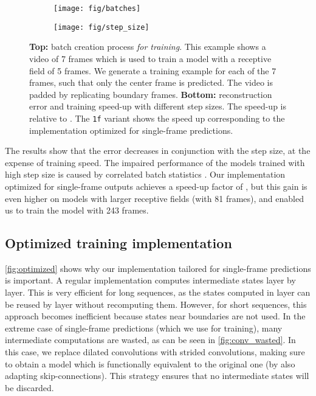 \documentclass[10pt,twocolumn,letterpaper]{article}
\begin{document}
\begin{figure}
	\centering
\begin{subfigure}{0.5\linewidth}
	    \centering
	    \texttt{[image: fig/batches]}
    	\caption{}
        \label{fig:batching}
	\end{subfigure}
\begin{subfigure}{\linewidth}
	    \centering
	    \texttt{[image: fig/step\_size]}
		\caption{}
		\label{fig:step_size}
	\end{subfigure}
	\caption{\textbf{Top:} batch creation process \emph{for training}. 
	This example shows a video of 7 frames which is used to train a model with a receptive field of 5 frames. 
	We generate a training example for each of the 7 frames, such that only the center frame is predicted. 
	The video is padded by replicating boundary frames. 
	\textbf{Bottom:} reconstruction error and training speed-up with different step sizes. The speed-up is relative to . 
	The \texttt{1f} variant shows the speed up corresponding to the implementation optimized for single-frame predictions.
	}
\end{figure}

The results show that the error decreases in conjunction with the step size, at the expense of training speed. 
The impaired performance of the models trained with high step size is caused by correlated batch statistics \cite{hoffer:norm:2018}. 
Our implementation optimized for single-frame outputs achieves a speed-up factor of , but this gain is even higher on models with larger receptive fields (\eg  with 81 frames), and enabled us to train the model with 243 frames.



\subsection{Optimized training implementation}
\label{app:optimize}

\autoref{fig:optimized} shows why our implementation tailored for single-frame predictions is important. A regular implementation computes intermediate states layer by layer. This is very efficient for long sequences, as the states computed in layer  can be reused by layer  without recomputing them. However, for short sequences, this approach becomes inefficient because states near boundaries are not used. In the extreme case of single-frame predictions (which we use for training), many intermediate computations are wasted, as can be seen in \autoref{fig:conv_wasted}. In this case, we replace dilated convolutions with strided convolutions, making sure to obtain a model which is functionally equivalent to the original one (\eg by also adapting skip-connections). This strategy ensures that no intermediate states will be discarded.
\end{document}
